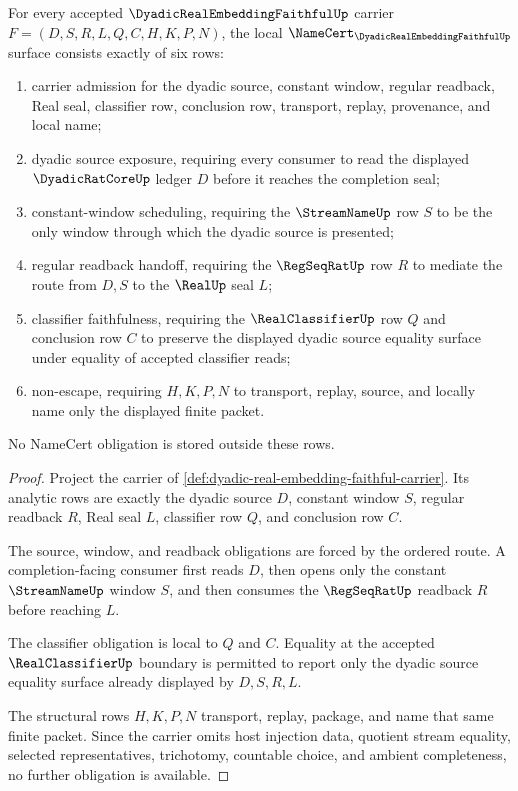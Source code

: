 \begin{theorem}
\label{thm:dyadic-real-embedding-faithful-namecert-obligations}
For every accepted $\DyadicRealEmbeddingFaithfulUp$ carrier $F=(D,S,R,L,Q,C,H,K,P,N)$, the local $\NameCert_{\DyadicRealEmbeddingFaithfulUp}$ surface consists exactly of six rows:
\begin{enumerate}
\item carrier admission for the dyadic source, constant window, regular readback, Real seal, classifier row, conclusion row, transport, replay, provenance, and local name;
\item dyadic source exposure, requiring every consumer to read the displayed $\DyadicRatCoreUp$ ledger $D$ before it reaches the completion seal;
\item constant-window scheduling, requiring the $\StreamNameUp$ row $S$ to be the only window through which the dyadic source is presented;
\item regular readback handoff, requiring the $\RegSeqRatUp$ row $R$ to mediate the route from $D,S$ to the $\RealUp$ seal $L$;
\item classifier faithfulness, requiring the $\RealClassifierUp$ row $Q$ and conclusion row $C$ to preserve the displayed dyadic source equality surface under equality of accepted classifier reads;
\item non-escape, requiring $H,K,P,N$ to transport, replay, source, and locally name only the displayed finite packet.
\end{enumerate}
No NameCert obligation is stored outside these rows.
\end{theorem}
\begin{proof}
Project the carrier of \autoref{def:dyadic-real-embedding-faithful-carrier}. Its analytic rows are exactly the dyadic source $D$, constant window $S$, regular readback $R$, Real seal $L$, classifier row $Q$, and conclusion row $C$.

The source, window, and readback obligations are forced by the ordered route. A completion-facing consumer first reads $D$, then opens only the constant $\StreamNameUp$ window $S$, and then consumes the $\RegSeqRatUp$ readback $R$ before reaching $L$.

The classifier obligation is local to $Q$ and $C$. Equality at the accepted $\RealClassifierUp$ boundary is permitted to report only the dyadic source equality surface already displayed by $D,S,R,L$.

The structural rows $H,K,P,N$ transport, replay, package, and name that same finite packet. Since the carrier omits host injection data, quotient stream equality, selected representatives, trichotomy, countable choice, and ambient completeness, no further obligation is available.
\end{proof}

